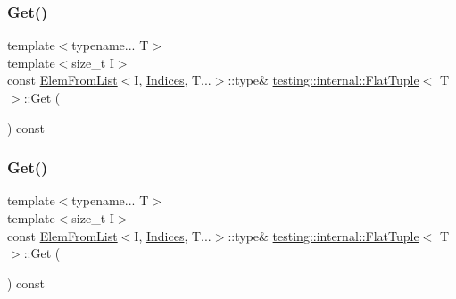 \subsubsection{\texorpdfstring{Get()}{Get()}\hspace{0.1cm}{\footnotesize\ttfamily [1/4]}}
{\footnotesize\ttfamily template$<$typename... T$>$ \\
template$<$size\+\_\+t I$>$ \\
const \mbox{\hyperlink{structtesting_1_1internal_1_1_elem_from_list}{Elem\+From\+List}}$<$I, \mbox{\hyperlink{classtesting_1_1internal_1_1_flat_tuple_a004b42fc11ac1a85a9b1560fa83cdf77}{Indices}}, T...$>$\+::type\& \mbox{\hyperlink{classtesting_1_1internal_1_1_flat_tuple}{testing\+::internal\+::\+Flat\+Tuple}}$<$ T $>$\+::Get (\begin{DoxyParamCaption}{ }\end{DoxyParamCaption}) const\hspace{0.3cm}{\ttfamily [inline]}}

\mbox{\label{classtesting_1_1internal_1_1_flat_tuple_a9ea6508fa6413ceca5e38b8077c67938}} 
\subsubsection{\texorpdfstring{Get()}{Get()}\hspace{0.1cm}{\footnotesize\ttfamily [2/4]}}
{\footnotesize\ttfamily template$<$typename... T$>$ \\
template$<$size\+\_\+t I$>$ \\
const \mbox{\hyperlink{structtesting_1_1internal_1_1_elem_from_list}{Elem\+From\+List}}$<$I, \mbox{\hyperlink{classtesting_1_1internal_1_1_flat_tuple_a004b42fc11ac1a85a9b1560fa83cdf77}{Indices}}, T...$>$\+::type\& \mbox{\hyperlink{classtesting_1_1internal_1_1_flat_tuple}{testing\+::internal\+::\+Flat\+Tuple}}$<$ T $>$\+::Get (\begin{DoxyParamCaption}{ }\end{DoxyParamCaption}) const\hspace{0.3cm}{\ttfamily [inline]}}

\mbox{\label{classtesting_1_1internal_1_1_flat_tuple_a48a13560f8963f727d81a7922e3b3e50}} 
